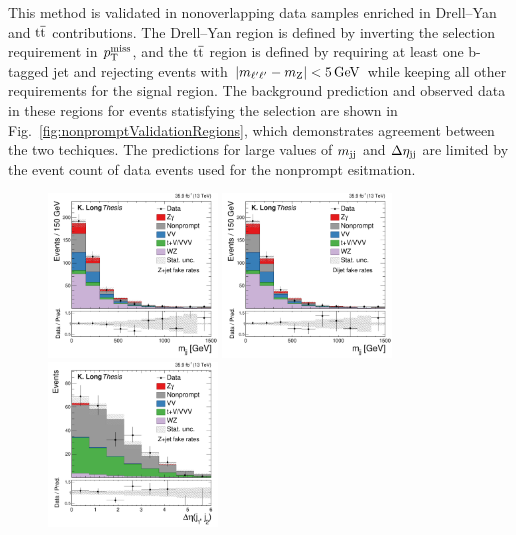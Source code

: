 This method is validated in nonoverlapping data samples enriched in Drell--Yan and ${\mathrm{t}\overline{\mathrm{t}}}$ contributions.
The Drell--Yan region is defined by inverting the selection requirement in $p_{\mathrm{T}}^\text{miss}$, and
the ${\mathrm{t}\overline{\mathrm{t}}}$ region is defined by requiring at least one b-tagged jet and rejecting events with $|m_{\ell'\ell'} - m_{\mathrm{Z}}| < 5\,\text{Ge\hspace{-.08em}V}$
while keeping all other requirements for the signal region.
The background prediction and observed data in these regions for events statisfying the {\WZjj} selection are shown in
Fig.~\ref{fig:nonpromptValidationRegions}, which demonstrates agreement between the two techiques.
The predictions for large values of $m_{\mathrm{jj}}$ and
$\Delta\eta_{\mathrm{jj}}$ are limited by the event count of data events used for the nonprompt esitmation.

\begin{figure}[htbp]
  \centering
   \includegraphics[width=0.4\textwidth]{figures/AnalysisProcedure/mjj_3lDYControl.pdf}
   \includegraphics[width=0.4\textwidth]{figures/AnalysisProcedure/mjj_3lDYControl_dijetFRs.pdf}
   \includegraphics[width=0.4\textwidth]{figures/AnalysisProcedure/dEtajj_3lTTbarControl.pdf}

\end{figure}
